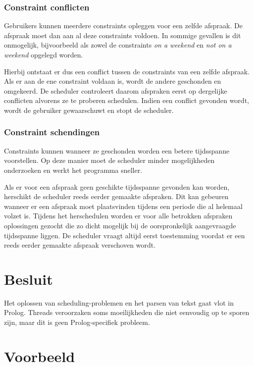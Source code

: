 \documentclass[a4paper]{article}
\begin{document}
\subsubsection{Constraint conflicten}
Gebruikers kunnen meerdere constraints opleggen voor een zelfde afspraak.
De afspraak moet dan aan al deze constraints voldoen.
In sommige gevallen is dit onmogelijk, bijvoorbeeld als zowel de constraints {\em on a weekend} en {\em not on a weekend} opgelegd worden.

Hierbij ontstaat er dus een conflict tussen de constraints van een zelfde afspraak.
Als er aan de ene constraint voldaan is, wordt de andere geschonden en omgekeerd.
De scheduler controleert daarom afspraken eerst op dergelijke conflicten alvorens ze te proberen schedulen.
Indien een conflict gevonden wordt, wordt de gebruiker gewaarschuwt en stopt de scheduler.


\subsubsection{Constraint schendingen}
Constraints kunnen wanneer ze geschonden worden een betere tijdsspanne voorstellen.
Op deze manier moet de scheduler minder mogelijkheden onderzoeken en werkt het programma sneller.

Als er voor een afspraak geen geschikte tijdsspanne gevonden kan worden, herschikt de scheduler reeds eerder gemaakte afspraken.
Dit kan gebeuren wanneer er een afspraak moet plaatsvinden tijdens een periode die al helemaal volzet is.
Tijdens het herschedulen worden er voor alle betrokken afspraken oplossingen gezocht die zo dicht mogelijk bij de oorspronkelijk aangevraagde tijdsspanne liggen.
De scheduler vraagt altijd eerst toestemming voordat er een reeds eerder gemaakte afspraak verschoven wordt.

\section{Besluit}

Het oplossen van scheduling-problemen en het parsen van tekst gaat vlot in Prolog.
Threads veroorzaken soms moeilijkheden die niet eenvoudig op te sporen zijn, maar dit is geen Prolog-specifiek probleem.

\appendix

\section{Voorbeeld}
\end{document}
